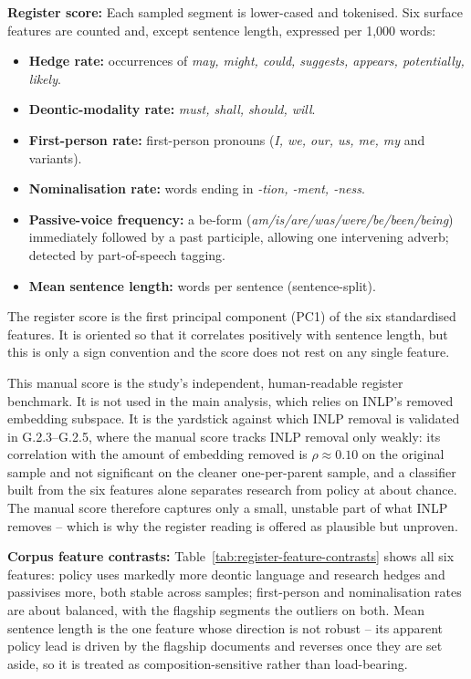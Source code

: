 \documentclass[12pt,a4paper]{article}
\begin{document}
\textbf{Register score:} Each sampled segment is lower-cased and tokenised. Six surface features are counted and, except sentence length, expressed per 1{,}000 words:
\begin{itemize}
  \item \textbf{Hedge rate:} occurrences of \emph{may, might, could, suggests, appears, potentially, likely}.
  \item \textbf{Deontic-modality rate:} \emph{must, shall, should, will}.
  \item \textbf{First-person rate:} first-person pronouns (\emph{I, we, our, us, me, my} and variants).
  \item \textbf{Nominalisation rate:} words ending in \emph{-tion, -ment, -ness}.
  \item \textbf{Passive-voice frequency:} a be-form (\emph{am/is/are/was/were/be/been/being}) immediately followed by a past participle, allowing one intervening adverb; detected by part-of-speech tagging.
  \item \textbf{Mean sentence length:} words per sentence (sentence-split).
\end{itemize}
The register score is the first principal component (PC1) of the six standardised features. It is oriented so that it correlates positively with sentence length, but this is only a sign convention and the score does not rest on any single feature.

This manual score is the study's independent, human-readable register benchmark. It is not used in the main analysis, which relies on INLP's removed embedding subspace. It is the yardstick against which INLP removal is validated in G.2.3--G.2.5, where the manual score tracks INLP removal only weakly: its correlation with the amount of embedding removed is $\rho \approx 0.10$ on the original sample and not significant on the cleaner one-per-parent sample, and a classifier built from the six features alone separates research from policy at about chance. The manual score therefore captures only a small, unstable part of what INLP removes -- which is why the register reading is offered as plausible but unproven.

\textbf{Corpus feature contrasts:} Table~\ref{tab:register-feature-contrasts} shows all six features: policy uses markedly more deontic language and research hedges and passivises more, both stable across samples; first-person and nominalisation rates are about balanced, with the flagship segments the outliers on both. Mean sentence length is the one feature whose direction is not robust -- its apparent policy lead is driven by the flagship documents and reverses once they are set aside, so it is treated as composition-sensitive rather than load-bearing.
\end{document}
